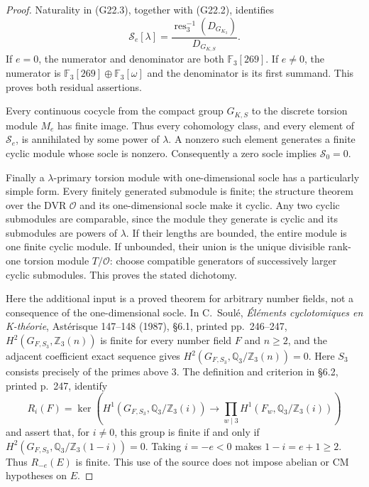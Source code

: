 \begin{proof}
Naturality in (G22.3), together with (G22.2), identifies
\[
 \mathcal S_e[\lambda]
 =\frac{\operatorname{res}_3^{-1}(D_{G_{K_3}})}
        {D_{G_{K,S}}}.                                  \tag{G22.6}
\]
If $e=0$, the numerator and denominator are both
$\mathbb F_3[269]$.  If $e\ne0$, the numerator is
$\mathbb F_3[269]\oplus\mathbb F_3[\omega]$ and the denominator
is its first summand.  This proves both residual assertions.

Every continuous cocycle from the compact group $G_{K,S}$ to the
discrete torsion module $M_e$ has finite image.  Thus every
cohomology class, and every element of $\mathcal S_e$, is annihilated
by some power of $\lambda$.  A nonzero such element generates a
finite cyclic module whose socle is nonzero.  Consequently a zero
socle implies $\mathcal S_0=0$.

Finally a $\lambda$-primary torsion module with one-dimensional socle
has a particularly simple form.  Every finitely generated submodule
is finite; the structure theorem over the DVR $\mathcal O$ and its
one-dimensional socle make it cyclic.  Any two cyclic submodules
are comparable, since the module they generate is cyclic and its
submodules are powers of $\lambda$.  If their lengths are bounded,
the entire module is one finite cyclic module.  If unbounded, their
union is the unique divisible rank-one torsion module
$T/\mathcal O$: choose compatible generators of successively larger
cyclic submodules.  This proves the stated dichotomy.

Here the additional input is a proved theorem for arbitrary number
fields, not a consequence of the one-dimensional socle.  In
C.~Soul\'e, \emph{\'El\'ements cyclotomiques en K-th\'eorie},
Ast\'erisque 147--148 (1987), \S6.1, printed pp.~246--247,
$H^2(G_{F,S_3},\mathbb Z_3(n))$ is finite for every number field
$F$ and $n\geq2$, and the adjacent coefficient exact sequence gives
$H^2(G_{F,S_3},\mathbb Q_3/\mathbb Z_3(n))=0$.
Here $S_3$ consists precisely of the primes above $3$.
The definition and criterion in \S6.2, printed p.~247, identify
\[
 R_i(F)=\ker\left(H^1(G_{F,S_3},\mathbb Q_3/\mathbb Z_3(i))
       \longrightarrow\prod_{w\mid3}
              H^1(F_w,\mathbb Q_3/\mathbb Z_3(i))\right)
\]
and assert that, for $i\ne0$, this group is finite if and only if
$H^2(G_{F,S_3},\mathbb Q_3/\mathbb Z_3(1-i))=0$.
Taking $i=-e<0$ makes $1-i=e+1\geq2$.
Thus $R_{-e}(E)$ is finite.  This use of the source does not impose
abelian or CM hypotheses on $E$.


\end{proof}
